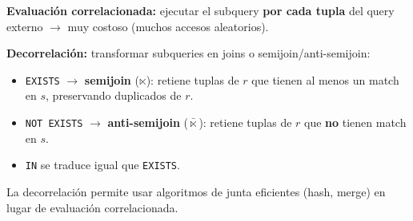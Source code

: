 \documentclass[11pt, a4paper]{article}
\begin{document}
\textbf{Evaluación correlacionada:} ejecutar el subquery \textbf{por cada tupla} del query externo $\rightarrow$ muy costoso (muchos accesos aleatorios).

\textbf{Decorrelación:} transformar subqueries en joins o semijoin/anti-semijoin:
\begin{itemize}[nosep]
	\item \texttt{EXISTS} $\to$ \textbf{semijoin} ($\ltimes$): retiene tuplas de $r$ que tienen al menos un match en $s$, preservando duplicados de $r$.
	\item \texttt{NOT EXISTS} $\to$ \textbf{anti-semijoin} ($\bar{\ltimes}$): retiene tuplas de $r$ que \textbf{no} tienen match en $s$.
	\item \texttt{IN} se traduce igual que \texttt{EXISTS}.
\end{itemize}

La decorrelación permite usar algoritmos de junta eficientes (hash, merge) en lugar de evaluación correlacionada.
\end{document}
